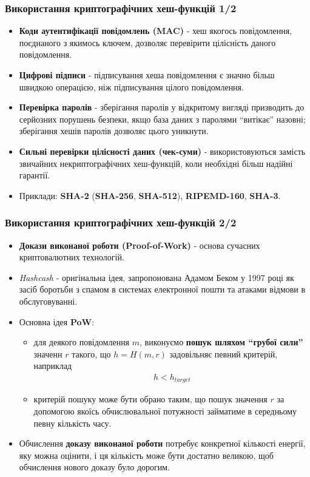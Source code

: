 \documentclass{beamer}
\begin{document}
\begin{frame}
  \frametitle{Використання криптографічних хеш-функцій 1/2}
  \begin{itemize}
  \item \textbf{Коди аутентифікації повідомлень (MAC)} - хеш якогось
    повідомлення, поєднаного з якимось ключем, дозволяє перевірити цілісність
    даного повідомлення.
  \item \textbf{Цифрові підписи} - підписування хеша повідомлення є значно більш
    швидкою операцією, ніж підписування цілого повідомлення.
  \item \textbf{Перевірка паролів} - зберігання паролів у відкритому вигляді
    призводить до серйозних порушень безпеки, якщо база даних з паролями ``витікає''
    назовні; зберігання хешів паролів дозволяє цього уникнути.
  \item \textbf{Сильні перевірки цілісності даних (чек-суми)} - використовуються
    замість звичайних некриптографічних хеш-функцій, коли необхідні більш
    надійні гарантії.
  \item Приклади: \textbf{SHA-2} (\textbf{SHA-256}, \textbf{SHA-512}),
    \textbf{RIPEMD-160}, \textbf{SHA-3}.
  \end{itemize}
\end{frame}

\begin{frame}
  \frametitle{Використання криптографічних хеш-функцій 2/2}
  \begin{itemize}
  \item \textbf{Докази виконаної роботи (Proof-of-Work)} - основа сучасних
    криптовалютних технологій.
  \item \textit{Hashcash} - оригінальна ідея, запропонована Адамом Беком у 1997
    році як засіб боротьби з спамом в системах електронної пошти та атаками
    відмови в обслуговуванні.
  \item Основна ідея \textbf{PoW}:
    \begin{itemize}
    \item для деякого повідомлення $m$, виконуємо \textbf{пошук шляхом ``грубої
        сили''} значенн $r$ такого, що $h = H(m, r)$ задовільняє певний
      критерій, наприклад 
      \begin{align*}
        h < h_{target}
      \end{align*}
    \item критерій пошуку може бути обрано таким, що пошук значення $r$ за
      допомогою якоїсь обчислювальної потужності займатиме в середньому певну
      кількість часу.
    \end{itemize}
  \item Обчислення \textbf{доказу виконаної роботи} потребує конкретної
    кількості енергії, яку можна оцінити, і ця кількість може бути достатно
    великою, щоб обчислення нового доказу було дорогим.
  \end{itemize}
\end{frame}
\end{document}
